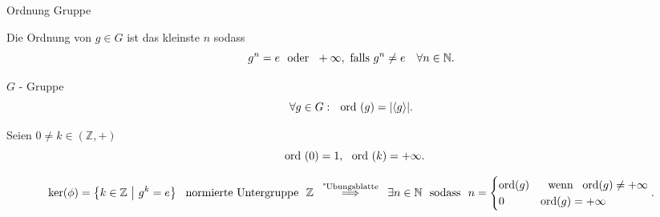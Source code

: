 \documentclass[class=article, crop=false]{standalone}
\begin{document}
\begin{zettel}{Ordnung Gruppe}
\begin{flashcard}
    \begin{definition}[Ordnung]
        Die Ordnung von $g \in  G$ ist das kleinste $n$ sodass
        \[
            g^n  = e \tx{ oder } +\infty, \text{ falls } g^n  \neq  e \quad \forall n \in  \mathbb{N}
        .\]
    \end{definition}
\end{flashcard}
\begin{theorem}
    $G$ - Gruppe
   \[
      \forall g \in  G : \tx{ ord}(g) = |\langle g \rangle|
   .\] 
\end{theorem}
\begin{example}
    Seien $0 \neq k \in  (\mathbb{Z}, +)$ 
    \[
       \tx{ ord}(0) = 1, \tx{ ord}(k) = + \infty
    .\]
\end{example}

\begin{theorem}
    \[
        \ker (\phi) =  \set{k \in  \mathbb{Z}}{g^k =  e} \tx{ normierte Untergruppe }  \mathbb{Z} \stackrel{\tx{ "Ubungsblatte } }{\implies} \exists n \in  \mathbb{N} \tx{ sodass } n =  \begin{cases}
            \ord(g) & \tx{  wenn } \ord(g) \neq + \infty\\
            0 &  \ord(g) =  + \infty\\
        \end{cases}
    .\]
    
\end{theorem}
\end{zettel}
\end{document}
